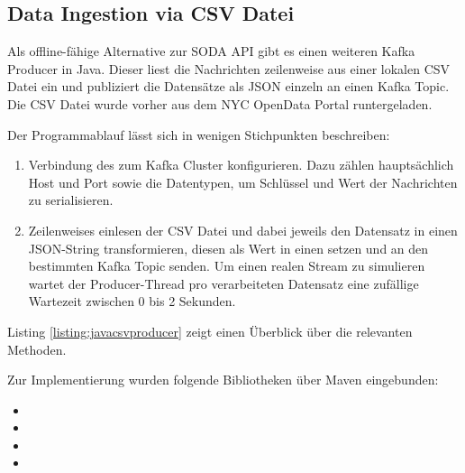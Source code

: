 \subsection{Data Ingestion via CSV Datei}
Als offline-fähige Alternative zur \ac{SODA} API gibt es einen weiteren Kafka Producer in Java. Dieser liest die Nachrichten zeilenweise aus einer lokalen \ac{CSV} Datei ein und publiziert die Datensätze als \ac{JSON} einzeln an einen Kafka Topic. Die \ac{CSV} Datei wurde vorher aus dem NYC OpenData Portal runtergeladen.

Der Programmablauf lässt sich in wenigen Stichpunkten beschreiben:
\begin{enumerate}
	\item Verbindung des  zum Kafka Cluster konfigurieren. Dazu zählen hauptsächlich Host und Port sowie die Datentypen, um Schlüssel und Wert der Nachrichten zu serialisieren.  
	\item Zeilenweises einlesen der \ac{CSV} Datei und dabei jeweils den Datensatz in einen \ac{JSON}-String transformieren, diesen  als Wert in einen  setzen und an den bestimmten Kafka Topic senden. Um einen realen Stream zu simulieren wartet der Producer-Thread pro verarbeiteten Datensatz eine zufällige Wartezeit zwischen 0 bis 2 Sekunden.
\end{enumerate}

Listing \ref{listing:javacsvproducer} zeigt einen Überblick über die relevanten Methoden.




Zur Implementierung wurden folgende Bibliotheken über Maven eingebunden:
\begin{itemize}
	\item {}
	\item {}
	\item {}
	\item {}
\end{itemize}

